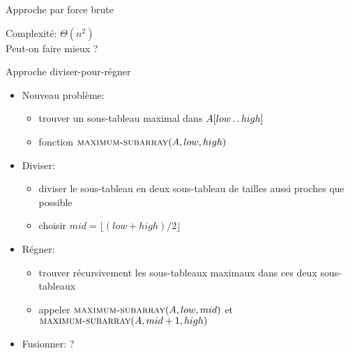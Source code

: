 \begin{frame}{Approche par force brute}

\begin{center}
{\small
{}
}
\end{center}

Complexité: $\Theta(n^2)$\\

Peut-on faire mieux ?

\end{frame}

\begin{frame}{Approche diviser-pour-régner}

\begin{itemize}
\item Nouveau problème:
\begin{itemize}
\item trouver un sous-tableau maximal dans $A[low\mathinner{\ldotp\ldotp} high]$
\item fonction $\textnormal{\scshape maximum-subarray}(A,low,high)$
\end{itemize}
\item Diviser:
\begin{itemize}
\item diviser le sous-tableau en deux sous-tableau de tailles aussi proches que possible
\item choisir $mid=\lfloor (low+high)/2 \rfloor$
\end{itemize}
\item Régner:
\begin{itemize}
\item trouver récursivement les sous-tableaux maximaux dans ces deux sous-tableaux
\item appeler $\textnormal{\scshape maximum-subarray}(A,low,mid)$ et $\textnormal{\scshape maximum-subarray}(A,mid+1,high)$
\end{itemize}
\item Fusionner: ?
\end{itemize}

\end{frame}

